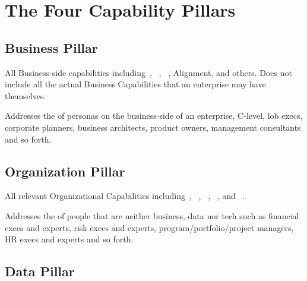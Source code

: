 \section{The Four Capability Pillars}\label{sec:ekg-maturity-the-four-pillars}


\subsection{Business Pillar}\label{subsec:ekg-maturity-the-four-pillars-business-pillar}

All Business-side capabilities including~,
~,
~, Alignment,
 and others.
Does not include all the actual Business Capabilities that
an enterprise may have themselves.

Addresses the  of personas on the business-side of an enterprise, C-level,
\gls{lob} execs,
corporate planners,
business architects, product owners,
management consultants and so forth.

\subsection{Organization Pillar}\label{subsec:ekg-maturity-the-four-pillars-organization-pillar}

All relevant Organizational Capabilities including~,
~,
~,
~, and
~.

Addresses the  of people that are neither business, data nor tech such as financial execs and experts, risk
execs and experts, program/portfolio/project managers, HR execs and experts and so forth.

\subsection{Data Pillar}\label{subsec:ekg-maturity-the-four-pillars-data-pillar}

